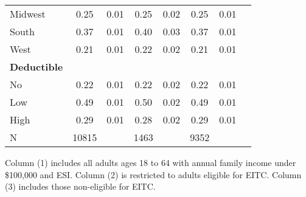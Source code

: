 \documentclass[smallcondensed,referee]{svjour3}
\begin{document}
\begin{table}[h!]
\begin{tabular}{l ccccccc}
Midwest             &        0.25&        0.01&        0.25&        0.02&        0.25&        0.01\\
South               &        0.37&        0.01&        0.40&        0.03&        0.37&        0.01\\
West                &        0.21&        0.01&        0.22&        0.02&        0.21&        0.01\\
\textbf{Deductible} &&&&&\\
No                  &        0.22&        0.01&        0.22&        0.02&        0.22&        0.01\\
Low                 &        0.49&        0.01&        0.50&        0.02&        0.49&        0.01\\
High                &        0.29&        0.01&        0.28&        0.02&        0.29&        0.01\\
\hline
N               &       10815&            &        1463&            &        9352&            \\

\hline
\end{tabular}
	\begin{minipage}{15cm}
		\footnotesize
Column (1) includes all adults ages 18 to 64 with annual family income under \$100,000 and ESI.  Column (2) is restricted to adults eligible for EITC. Column (3) includes those non-eligible for EITC. 
	\end{minipage}
\end{table}
\end{document}
